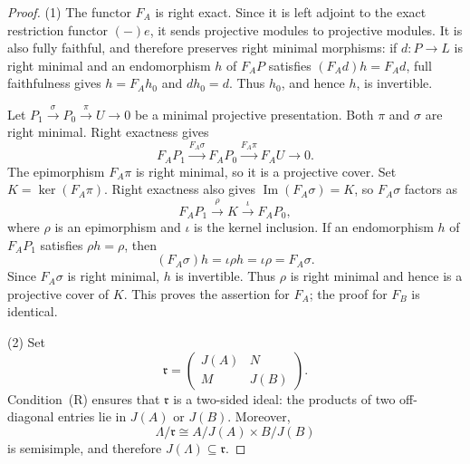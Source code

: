 \documentclass[11pt,reqno]{amsart}
\theoremstyle{definition}
\theoremstyle{remark}
\numberwithin{equation}{section}
\begin{document}
\begin{proof}
\textup{(1)} The functor $F_A$ is right exact.  Since it is left adjoint to
the exact restriction functor $(-)e$, it sends projective modules to
projective modules.  It is also fully faithful, and therefore preserves right
minimal morphisms: if $d:P\to L$ is right minimal and an endomorphism $h$
of $F_AP$ satisfies $(F_Ad)h=F_Ad$, full faithfulness gives $h=F_Ah_0$
and $dh_0=d$.  Thus $h_0$, and hence $h$, is invertible.

Let $P_1\xrightarrow{\sigma}P_0\xrightarrow{\pi}U\to0$ be a minimal
projective presentation.  Both $\pi$ and $\sigma$ are right minimal.
Right exactness gives
\[
 F_AP_1\xrightarrow{F_A\sigma}F_AP_0
 \xrightarrow{F_A\pi}F_AU\longrightarrow0.
\]
The epimorphism $F_A\pi$ is right minimal, so it is a projective cover.
Set $K=\ker(F_A\pi)$.  Right exactness also gives
$\operatorname{Im}(F_A\sigma)=K$, so $F_A\sigma$ factors as
\[
 F_AP_1\xrightarrow{\rho}K\xrightarrow{\iota}F_AP_0,
\]
where $\rho$ is an epimorphism and $\iota$ is the kernel inclusion.  If an
endomorphism $h$ of $F_AP_1$ satisfies $\rho h=\rho$, then
\[
 (F_A\sigma)h=\iota\rho h=\iota\rho=F_A\sigma.
\]
Since $F_A\sigma$ is right minimal, $h$ is invertible.  Thus $\rho$ is
right minimal and hence is a projective cover of $K$.
This proves the assertion for $F_A$; the proof for $F_B$ is identical.

\textup{(2)}
Set
\[
 \mathfrak r=\begin{pmatrix}J(A)&N\\M&J(B)\end{pmatrix}.
\]
Condition~\textup{(R)} ensures that $\mathfrak r$ is a two-sided ideal:
the products of two off-diagonal entries lie in $J(A)$ or $J(B)$.
Moreover,
\[
 \Lambda/\mathfrak r\cong A/J(A)\times B/J(B)
\]
is semisimple, and therefore $J(\Lambda)\subseteq\mathfrak r$.


\end{proof}
\end{document}
